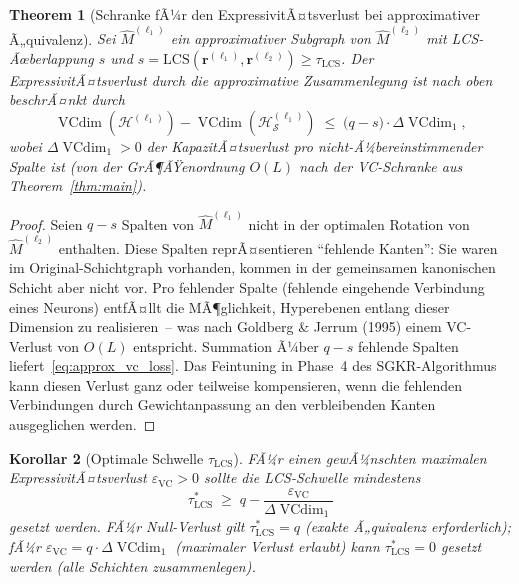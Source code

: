 ﻿\documentclass[12pt, a4paper, openany]{report}
\newtheorem{theorem}{Theorem}[chapter]
\newtheorem{corollary}[theorem]{Korollar}
\newcommand{\calH}{\mathcal{H}}
\newcommand{\calS}{\mathcal{S}}
\newcommand{\eps}{\varepsilon}
\DeclareMathOperator{\VC}{VCdim}
\begin{document}
\begin{theorem}[Schranke fÃ¼r den ExpressivitÃ¤tsverlust bei approximativer Ã„quivalenz]
\label{thm:expressivity_approx}
Sei $\hat{M}^{(\ell_1)}$ ein approximativer Subgraph von $\hat{M}^{(\ell_2)}$
mit LCS-Ãœberlappung $s$ und $s = \mathrm{LCS}(\bm{r}^{(\ell_1)}, \bm{r}^{(\ell_2)}) \geq \tau_{\mathrm{LCS}}$.
Der ExpressivitÃ¤tsverlust durch die approximative Zusammenlegung ist nach oben
beschrÃ¤nkt durch
\begin{equation}
  \label{eq:approx_vc_loss}
  \VC(\calH^{(\ell_1)}) - \VC(\calH_{\calS}^{(\ell_1)})
  \;\leq\;
  \bigl(q - s\bigr) \cdot \Delta\VC_1,
\end{equation}
wobei $\Delta\VC_1 > 0$ der KapazitÃ¤tsverlust pro nicht-Ã¼bereinstimmender
Spalte ist (von der GrÃ¶ÃŸenordnung $O(L)$ nach der VC-Schranke aus
Theorem~\ref{thm:main}).
\end{theorem}

\begin{proof}
Seien $q - s$ Spalten von $\hat{M}^{(\ell_1)}$ nicht in der optimalen Rotation
von $\hat{M}^{(\ell_2)}$ enthalten.  Diese Spalten reprÃ¤sentieren
``fehlende Kanten'': Sie waren im Original-Schichtgraph vorhanden, kommen
in der gemeinsamen kanonischen Schicht aber nicht vor.  Pro fehlender
Spalte (fehlende eingehende Verbindung eines Neurons) entfÃ¤llt die MÃ¶glichkeit,
Hyperebenen entlang dieser Dimension zu realisieren~-- was nach Goldberg \&
Jerrum (1995) einem VC-Verlust von $O(L)$ entspricht.  Summation Ã¼ber
$q - s$ fehlende Spalten liefert~\eqref{eq:approx_vc_loss}.  Das
Feintuning in Phase~4 des SGKR-Algorithmus kann diesen Verlust ganz oder
teilweise kompensieren, wenn die fehlenden Verbindungen durch Gewichtanpassung
an den verbleibenden Kanten ausgeglichen werden.
\end{proof}

\begin{corollary}[Optimale Schwelle $\tau_{\mathrm{LCS}}$]
\label{cor:optimal_tau}
FÃ¼r einen gewÃ¼nschten maximalen ExpressivitÃ¤tsverlust
$\eps_{\mathrm{VC}} > 0$ sollte die LCS-Schwelle mindestens
\[
  \tau_{\mathrm{LCS}}^*
  \;\geq\; q - \frac{\eps_{\mathrm{VC}}}{\Delta\VC_1}
\]
gesetzt werden.  FÃ¼r Null-Verlust gilt $\tau_{\mathrm{LCS}}^* = q$ (exakte
Ã„quivalenz erforderlich); fÃ¼r $\eps_{\mathrm{VC}} = q \cdot \Delta\VC_1$
(maximaler Verlust erlaubt) kann $\tau_{\mathrm{LCS}}^* = 0$ gesetzt werden
(alle Schichten zusammenlegen).
\end{corollary}
\end{document}
